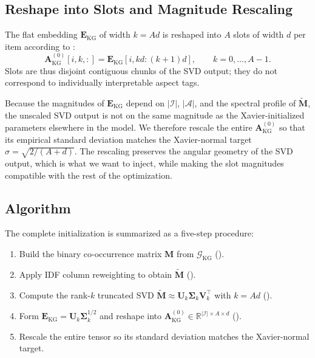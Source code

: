 \subsection{Reshape into Slots and Magnitude Rescaling}
\label{sec:kgsvd-reshape}

The flat embedding $\mathbf{E}_{\mathrm{KG}}$ of width $k = A d$ is reshaped into $A$ slots of width $d$ per item according to :
\begin{equation}
\label{eq:reshape}
\mathbf{A}_{\mathrm{KG}}^{(0)}[i, k, :] = \mathbf{E}_{\mathrm{KG}}[i, k d : (k+1) d], \qquad k = 0, \dots, A-1.
\end{equation}
Slots are thus disjoint contiguous chunks of the SVD output; they do not correspond to individually interpretable aspect tags.

Because the magnitudes of $\mathbf{E}_{\mathrm{KG}}$ depend on $|\mathcal{I}|$, $|\mathcal{A}|$, and the spectral profile of $\tilde{\mathbf{M}}$, the unscaled SVD output is not on the same magnitude as the Xavier-initialized parameters elsewhere in the model. We therefore rescale the entire $\mathbf{A}_{\mathrm{KG}}^{(0)}$ so that its empirical standard deviation matches the Xavier-normal target $\sigma = \sqrt{2 / (A + d)}$. The rescaling preserves the angular geometry of the SVD output, which is what we want to inject, while making the slot magnitudes compatible with the rest of the optimization.

\subsection{Algorithm}
\label{sec:kgsvd-algo}

The complete initialization is summarized as a five-step procedure:

\begin{enumerate}
  \item Build the binary co-occurrence matrix $\mathbf{M}$ from $\mathcal{G}_{\mathrm{KG}}$ ().
  \item Apply IDF column reweighting to obtain $\tilde{\mathbf{M}}$ ().
  \item Compute the rank-$k$ truncated SVD $\tilde{\mathbf{M}} \approx \mathbf{U}_k \boldsymbol{\Sigma}_k \mathbf{V}_k^{\top}$ with $k = A d$ ().
  \item Form $\mathbf{E}_{\mathrm{KG}} = \mathbf{U}_k \boldsymbol{\Sigma}_k^{1/2}$ and reshape into $\mathbf{A}_{\mathrm{KG}}^{(0)} \in \mathbb{R}^{|\mathcal{I}| \times A \times d}$ ().
  \item Rescale the entire tensor so its standard deviation matches the Xavier-normal target.
\end{enumerate}

